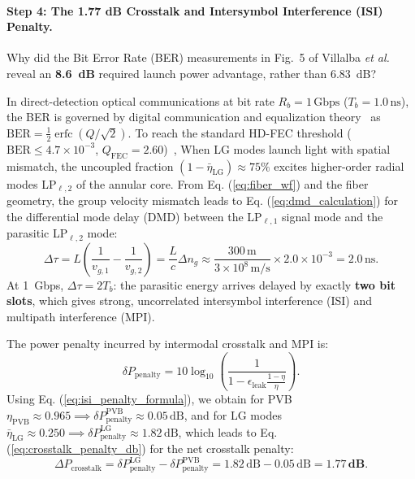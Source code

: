 \documentclass[11pt,a4paper]{article}
\begin{document}
\paragraph{Step 4: The 1.77 dB Crosstalk and Intersymbol Interference (ISI) Penalty.}
Why did the Bit Error Rate (BER) measurements in Fig.~5 of Villalba \emph{et al.}~\cite{Villalba2023} reveal an \textbf{8.6~dB} required launch power advantage, rather than 6.83~dB?

In direct-detection optical communications at bit rate $R_b = 1\,\text{Gbps}$ ($T_b = 1.0\,\text{ns}$), the BER is governed by digital communication and equalization theory~\cite{Proakis2008} as $\text{BER} = \frac{1}{2} \operatorname{erfc}(Q / \sqrt{2})$. To reach the standard HD-FEC threshold ($\text{BER} \le 4.7 \times 10^{-3}$, $Q_{\text{FEC}} = 2.60$)~\cite{ITUTG9751}, When LG modes launch light with spatial mismatch, the uncoupled fraction $(1 - \bar{\eta}_{\text{LG}}) \approx 75\%$ excites higher-order radial modes LP$_{\ell, 2}$ of the annular core. From Eq. (\ref{eq:fiber_wf}) and the fiber geometry, the group velocity mismatch leads to Eq. (\ref{eq:dmd_calculation}) for the differential mode delay (DMD) between the LP$_{\ell, 1}$ signal mode and the parasitic LP$_{\ell, 2}$ mode:
\begin{equation}
\Delta \tau = L \left( \frac{1}{v_{g, 1}} - \frac{1}{v_{g, 2}} \right) = \frac{L}{c} \Delta n_g \approx \frac{300\,\text{m}}{3 \times 10^8\,\text{m/s}} \times 2.0 \times 10^{-3} = 2.0\,\text{ns}.
\label{eq:dmd_calculation}
\end{equation}
At 1~Gbps, $\Delta \tau = 2 T_b$: the parasitic energy arrives delayed by exactly \textbf{two bit slots}, which gives strong, uncorrelated intersymbol interference (ISI) and multipath interference (MPI).

The power penalty incurred by intermodal crosstalk and MPI is:
\begin{equation}
\delta P_{\text{penalty}} = 10 \log_{10}\left( \frac{1}{1 - \epsilon_{\text{leak}} \frac{1 - \eta}{\eta}} \right).
\label{eq:isi_penalty_formula}
\end{equation}
Using Eq. (\ref{eq:isi_penalty_formula}), we obtain for PVB $\eta_{\text{PVB}} \approx 0.965 \implies \delta P_{\text{penalty}}^{\text{PVB}} \approx 0.05\,\text{dB}$, and for LG modes $\bar{\eta}_{\text{LG}} \approx 0.250 \implies \delta P_{\text{penalty}}^{\text{LG}} \approx 1.82\,\text{dB}$, which leads to Eq. (\ref{eq:crosstalk_penalty_db}) for the net crosstalk penalty:
\begin{equation}
\Delta P_{\text{crosstalk}} = \delta P_{\text{penalty}}^{\text{LG}} - \delta P_{\text{penalty}}^{\text{PVB}} = 1.82\,\text{dB} - 0.05\,\text{dB} = \mathbf{1.77\,\text{dB}}.
\label{eq:crosstalk_penalty_db}
\end{equation}
\end{document}
